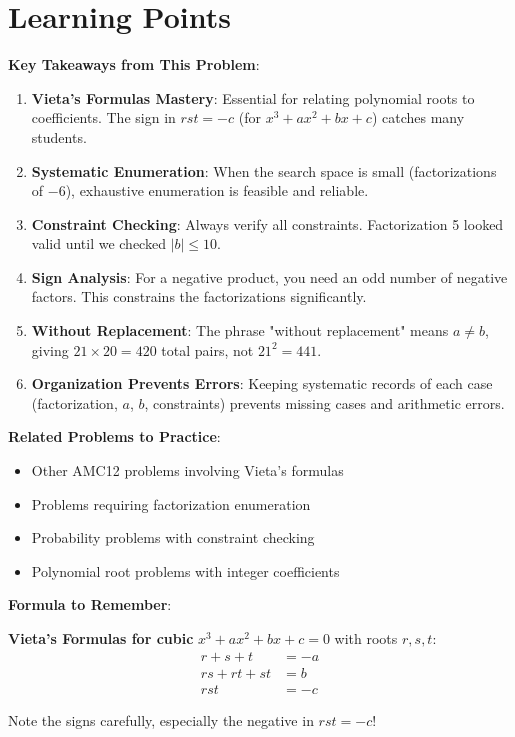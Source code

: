 \documentclass[12pt]{article}
\begin{document}
\section*{Learning Points}

\textbf{Key Takeaways from This Problem}:

\begin{enumerate}
    \item \textbf{Vieta's Formulas Mastery}: Essential for relating polynomial roots to coefficients. The sign in $rst = -c$ (for $x^3 + ax^2 + bx + c$) catches many students.
    
    \item \textbf{Systematic Enumeration}: When the search space is small (factorizations of $-6$), exhaustive enumeration is feasible and reliable.
    
    \item \textbf{Constraint Checking}: Always verify all constraints. Factorization 5 looked valid until we checked $|b| \leq 10$.
    
    \item \textbf{Sign Analysis}: For a negative product, you need an odd number of negative factors. This constrains the factorizations significantly.
    
    \item \textbf{Without Replacement}: The phrase "without replacement" means $a \neq b$, giving $21 \times 20 = 420$ total pairs, not $21^2 = 441$.
    
    \item \textbf{Organization Prevents Errors}: Keeping systematic records of each case (factorization, $a$, $b$, constraints) prevents missing cases and arithmetic errors.
\end{enumerate}

\vspace{0.5cm}

\textbf{Related Problems to Practice}:
\begin{itemize}
    \item Other AMC12 problems involving Vieta's formulas
    \item Problems requiring factorization enumeration
    \item Probability problems with constraint checking
    \item Polynomial root problems with integer coefficients
\end{itemize}

\vspace{0.5cm}

\textbf{Formula to Remember}:

\textbf{Vieta's Formulas for cubic} $x^3 + ax^2 + bx + c = 0$ with roots $r, s, t$:
\begin{align*}
    r + s + t &= -a \\
    rs + rt + st &= b \\
    rst &= -c
\end{align*}

Note the signs carefully, especially the negative in $rst = -c$!
\end{document}
